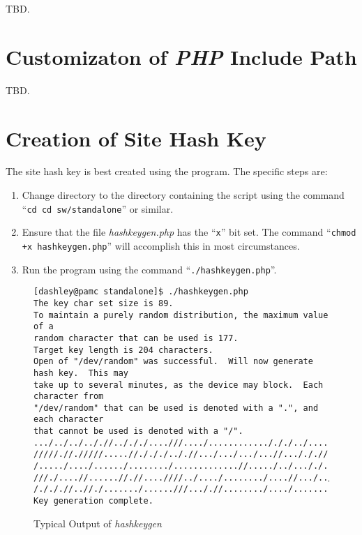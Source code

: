 TBD.


\section{Customizaton of \emph{PHP} Include Path}
\label{cist0:scpi0}

TBD.


\section{Creation of Site Hash Key}
\label{cist0:scsh0}

The site hash key is best created using the
 program.  The specific steps are:

\begin{enumerate}
\item Change directory to the directory containing the script using
      the command ``\texttt{cd cd sw/standalone}'' or similar.
\item Ensure that the file \emph{hashkeygen.php} has the
      ``\texttt{x}'' bit set.  The command ``\texttt{chmod +x hashkeygen.php}''
      will accomplish this in most circumstances.
\item Run the program using the command ``\texttt{./hashkeygen.php}''.
\end{enumerate}
 
\begin{figure}
\begin{footnotesize}
\begin{verbatim}
[dashley@pamc standalone]$ ./hashkeygen.php
The key char set size is 89.
To maintain a purely random distribution, the maximum value of a
random character that can be used is 177.
Target key length is 204 characters.
Open of "/dev/random" was successful.  Will now generate hash key.  This may
take up to several minutes, as the device may block.  Each character from
"/dev/random" that can be used is denoted with a ".", and each character
that cannot be used is denoted with a "/".
.../../../.././/../././....///..../............/././../.....
/////.//./////.....//./././.././/.../.../.../...//.../././/.
/...../..../....../......../.............//...../../..././..
///./....//......//.//....////../..../......../....//.../../
/./././/..//./......./......///..././/......../..../.......
Key generation complete.
\end{verbatim}
\end{footnotesize}
\caption{Typical Output of \emph{hashkeygen}}
\label{fig:cist0:scsh0:00}
\end{figure}

